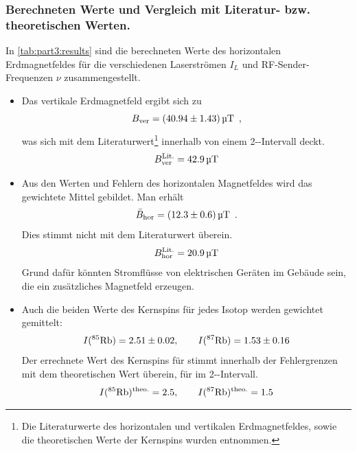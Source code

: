 \subsubsection*{Berechneten Werte und Vergleich mit Literatur- bzw. theoretischen Werten.}
In \autoref{tab:part3:results} sind die berechneten Werte des horizontalen Erdmagnetfeldes für die verschiedenen Laserströmen $I_L$ und 
RF-Sender-Frequenzen $\nu$ zusammengestellt. 
\begin{itemize}
    \item Das vertikale Erdmagnetfeld ergibt sich zu
    \begin{equation}
        B_\text{ver} = (40.94 \pm 1.43)\,\text{\textmu T}\ \, ,
    \end{equation}
    was sich mit dem Literaturwert\footnote{Die Literaturwerte des horizontalen und vertikalen Erdmagnetfeldes, sowie die theoretischen Werte der
    Kernspins wurden \cite{manual} entnommen.} innerhalb von einem 2-\textsigma-Intervall deckt.
    \begin{equation}
    \label{eq:litvalBver}
        B_\text{ver}^{\text{Lit.}} = 42.9\,\text{\textmu T}
    \end{equation}
    \item Aus den Werten und Fehlern des horizontalen Magnetfeldes wird das gewichtete Mittel gebildet. Man erhält
    \begin{equation}
        \bar{B}_\text{hor} = (12.3 \pm 0.6)\,\text{\textmu T}\ \, .
    \end{equation}
    Dies stimmt nicht mit dem Literaturwert überein.
    \begin{equation}
        B_\text{hor}^{\text{Lit.}} = 20.9\,\text{\textmu T}
    \end{equation}
    Grund dafür könnten Stromflüsse von elektrischen Geräten im Gebäude sein, die ein zusätzliches Magnetfeld erzeugen.
    \item Auch die beiden Werte des Kernspins für jedes Isotop werden gewichtet gemittelt:
    \begin{equation}
        I(\text{$^{85}$Rb}) = 2.51 \pm 0.02, \qquad I(\text{$^{87}$Rb}) = 1.53 \pm 0.16
    \end{equation}
    Der errechnete Wert des Kernspins für  stimmt innerhalb der Fehlergrenzen mit dem theoretischen Wert überein, 
    für  im 2-\textsigma-Intervall.
    \begin{equation}
        I(\text{$^{85}$Rb})^\text{theo.} = 2.5, \qquad I(\text{$^{87}$Rb})^\text{theo.} = 1.5
    \end{equation}
\end{itemize}